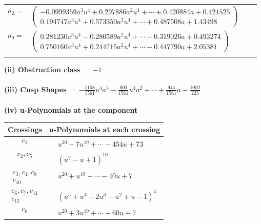 \documentclass[1p]{elsarticle_modified}
\theoremstyle{definition}
\begin{document}
\begin{tabular}{m{7pt} m{180pt} m{7pt} m{180pt} }
\flushright $a_{2}=$&$\begin{pmatrix}-0.0999359 a^{3} u^{4}+0.297886 a^{2} u^{4}+\cdots+0.420884 a+0.421525\\0.194747 a^{3} u^{4}+0.573350 a^{2} u^{4}+\cdots+0.487508 a+1.43498\end{pmatrix}$ \\
\flushright $a_{9}=$&$\begin{pmatrix}0.281230 a^{3} u^{4}-0.280589 a^{2} u^{4}+\cdots-0.319026 a+0.493274\\0.750160 a^{3} u^{4}+0.244715 a^{2} u^{4}+\cdots-0.447790 a+2.05381\end{pmatrix}$\\&\end{tabular}
\flushleft \textbf{(ii) Obstruction class $= -1$}\\~\\
\flushleft \textbf{(iii) Cusp Shapes $= -\frac{1108}{1561} u^4 a^3-\frac{900}{1561} u^4 a^2+\cdots+\frac{944}{1561} a-\frac{1002}{223}$}\\~\\
\newpage\renewcommand{\arraystretch}{1}
\flushleft \textbf{(iv) u-Polynomials at the component}\newline \\
\begin{tabular}{m{50pt}|m{274pt}}
Crossings & \hspace{64pt}u-Polynomials at each crossing \\
\hline $$\begin{aligned}c_{1}\end{aligned}$$&$\begin{aligned}
&u^{20}-7 u^{19}+\cdots-454 u+73
\end{aligned}$\\
\hline $$\begin{aligned}c_{2},c_{5}\end{aligned}$$&$\begin{aligned}
&(u^2- u+1)^{10}
\end{aligned}$\\
\hline $$\begin{aligned}c_{3},c_{4},c_{8}\\c_{10}\end{aligned}$$&$\begin{aligned}
&u^{20}+u^{19}+\cdots-40 u+7
\end{aligned}$\\
\hline $$\begin{aligned}c_{6},c_{7},c_{11}\\c_{12}\end{aligned}$$&$\begin{aligned}
&(u^5+u^4-2 u^3- u^2+u-1)^4
\end{aligned}$\\
\hline $$\begin{aligned}c_{9}\end{aligned}$$&$\begin{aligned}
&u^{20}+3 u^{19}+\cdots+60 u+7
\end{aligned}$\\
\hline
\end{tabular}\\~\\
\end{document}

